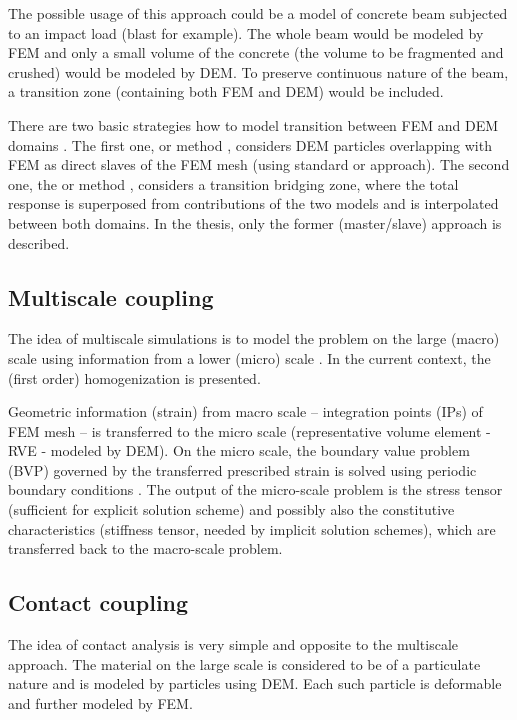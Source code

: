 The possible usage of this approach could be a model of concrete beam subjected to an impact load (blast for example).
The whole beam would be modeled by FEM and only a small volume of the
concrete (the volume to be fragmented and crushed) would be modeled by DEM.
To preserve continuous nature of the beam, a transition zone (containing both FEM and DEM) would be included.

There are two basic strategies how to model transition between FEM and DEM domains \cite{XuGracieBelytschko2002a}.
The first one,  or  method \cite{AzevedoLemos2006a}, considers DEM particles overlapping with FEM as direct slaves of the FEM mesh (using standard  or  approach).
The second one, the  or  method \cite{RousseauFranginMarinDaudville2009a,WellmannWriggers2012a}, considers a transition bridging zone, where the total response is superposed from contributions of the two models and is interpolated between both domains.
In the thesis, only the former (master/slave) approach is described.

\subsection{Multiscale coupling}
The idea of multiscale simulations is to model the problem on the large (macro) scale using information from a lower (micro) scale \cite{RojekOnate2007a,WellmannWriggers2012a}.
In the current context, the (first order) homogenization \cite{GeersKouznetsovaBrekelmans2010a} is presented.

Geometric information (strain) from macro scale -- integration points (IPs) of FEM mesh -- is transferred to the micro scale (representative volume element - RVE - modeled by DEM).
On the micro scale, the boundary value problem (BVP) governed by the transferred prescribed strain is solved using periodic boundary conditions \cite{StranskyJirasek2011}.
The output of the micro-scale problem is the stress tensor (sufficient for explicit solution scheme) and possibly also the constitutive characteristics (stiffness tensor, needed by implicit solution schemes), which are transferred back to the macro-scale problem.

\subsection{Contact coupling}
The idea of contact analysis \cite{Frenning2008a} is very simple and opposite to the multiscale approach.
The material on the large scale is considered to be of a particulate nature and is modeled by particles using DEM.
Each such particle is deformable and further modeled by FEM.

